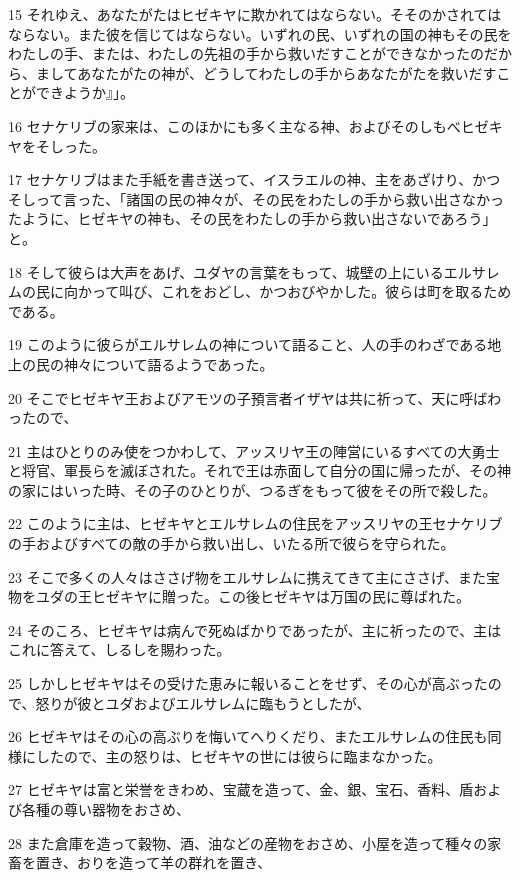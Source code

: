 \par 15 それゆえ、あなたがたはヒゼキヤに欺かれてはならない。そそのかされてはならない。また彼を信じてはならない。いずれの民、いずれの国の神もその民をわたしの手、または、わたしの先祖の手から救いだすことができなかったのだから、ましてあなたがたの神が、どうしてわたしの手からあなたがたを救いだすことができようか』」。
\par 16 セナケリブの家来は、このほかにも多く主なる神、およびそのしもべヒゼキヤをそしった。
\par 17 セナケリブはまた手紙を書き送って、イスラエルの神、主をあざけり、かつそしって言った、「諸国の民の神々が、その民をわたしの手から救い出さなかったように、ヒゼキヤの神も、その民をわたしの手から救い出さないであろう」と。
\par 18 そして彼らは大声をあげ、ユダヤの言葉をもって、城壁の上にいるエルサレムの民に向かって叫び、これをおどし、かつおびやかした。彼らは町を取るためである。
\par 19 このように彼らがエルサレムの神について語ること、人の手のわざである地上の民の神々について語るようであった。
\par 20 そこでヒゼキヤ王およびアモツの子預言者イザヤは共に祈って、天に呼ばわったので、
\par 21 主はひとりのみ使をつかわして、アッスリヤ王の陣営にいるすべての大勇士と将官、軍長らを滅ぼされた。それで王は赤面して自分の国に帰ったが、その神の家にはいった時、その子のひとりが、つるぎをもって彼をその所で殺した。
\par 22 このように主は、ヒゼキヤとエルサレムの住民をアッスリヤの王セナケリブの手およびすべての敵の手から救い出し、いたる所で彼らを守られた。
\par 23 そこで多くの人々はささげ物をエルサレムに携えてきて主にささげ、また宝物をユダの王ヒゼキヤに贈った。この後ヒゼキヤは万国の民に尊ばれた。
\par 24 そのころ、ヒゼキヤは病んで死ぬばかりであったが、主に祈ったので、主はこれに答えて、しるしを賜わった。
\par 25 しかしヒゼキヤはその受けた恵みに報いることをせず、その心が高ぶったので、怒りが彼とユダおよびエルサレムに臨もうとしたが、
\par 26 ヒゼキヤはその心の高ぶりを悔いてへりくだり、またエルサレムの住民も同様にしたので、主の怒りは、ヒゼキヤの世には彼らに臨まなかった。
\par 27 ヒゼキヤは富と栄誉をきわめ、宝蔵を造って、金、銀、宝石、香料、盾および各種の尊い器物をおさめ、
\par 28 また倉庫を造って穀物、酒、油などの産物をおさめ、小屋を造って種々の家畜を置き、おりを造って羊の群れを置き、
